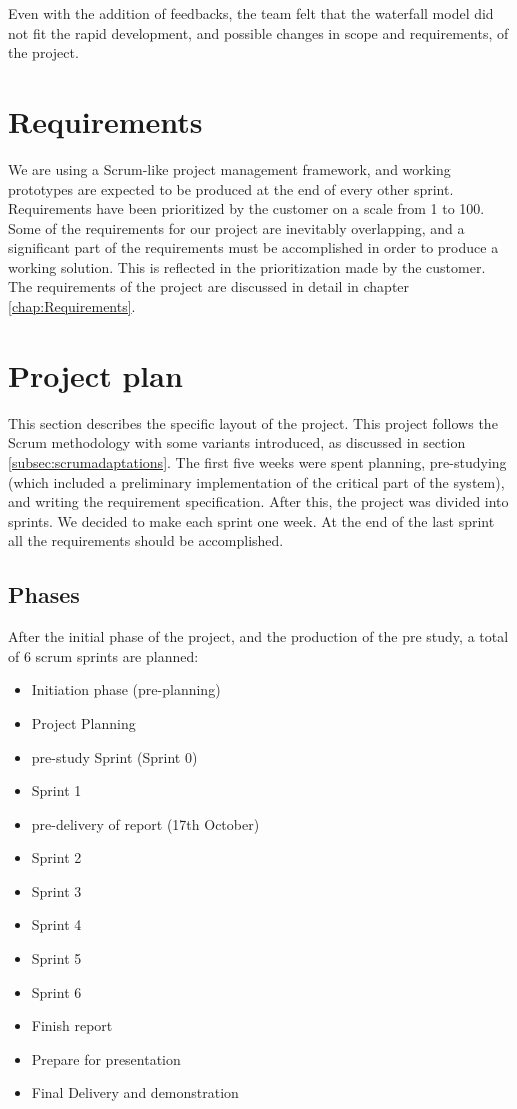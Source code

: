 \documentclass[11pt,a4paper,titlepage,oneside]{report}
\begin{document}
Even with the addition of feedbacks, the team felt that the waterfall model did not fit the rapid development, and possible changes in scope and requirements, of the project. 

\section{Requirements}
We are using a Scrum-like project management framework, and working \glspl{prototype} are expected to be produced at the end of every other sprint. Requirements have been prioritized by the customer on a scale from 1 to 100. Some of the requirements for our project are inevitably overlapping, and a significant part of the requirements must be accomplished in order to produce a working solution. This is reflected in the prioritization made by the customer. The requirements of the project are discussed in detail in chapter \ref{chap:Requirements}.

\section{Project plan}
This section describes the specific layout of the project. This project follows the Scrum methodology with some variants introduced, as discussed in section \ref{subsec:scrumadaptations}. The first five weeks were spent planning, pre-studying (which included a preliminary implementation of the critical part of the system), and writing the requirement specification. After this, the project was divided into sprints. We decided to make each sprint one week. At the end of the last sprint all the requirements should be accomplished.

\subsection{Phases}
After the initial phase of the project, and the production of the pre study, a total of 6 scrum sprints are planned:
\begin{itemize}
\item Initiation phase (pre-planning)
\item Project Planning
\item \Gls{pre-study} Sprint (Sprint 0)

\item Sprint 1
\item \Gls{pre-delivery} of report (17th October)

\item Sprint 2
\item Sprint 3
\item Sprint 4
\item Sprint 5
\item Sprint 6

\item Finish report
\item Prepare for presentation
\item Final Delivery and demonstration
\end{itemize}
\end{document}
